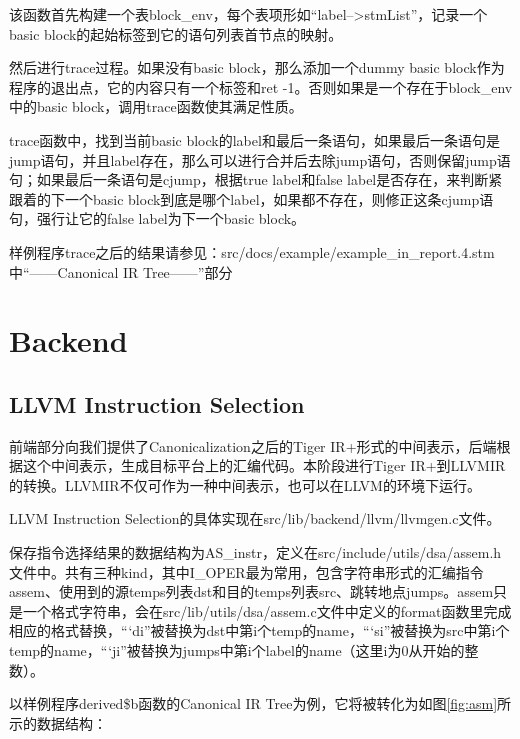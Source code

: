 \documentclass{article}
\begin{document}
该函数首先构建一个表block\_env，每个表项形如“label-->stmList”，记录一个basic block的起始标签到它的语句列表首节点的映射。

然后进行trace过程。如果没有basic block，那么添加一个dummy basic block作为程序的退出点，它的内容只有一个标签和ret -1。否则如果是一个存在于block\_env中的basic block，调用trace函数使其满足性质。

trace函数中，找到当前basic block的label和最后一条语句，如果最后一条语句是jump语句，并且label存在，那么可以进行合并后去除jump语句，否则保留jump语句；如果最后一条语句是cjump，根据true label和false label是否存在，来判断紧跟着的下一个basic block到底是哪个label，如果都不存在，则修正这条cjump语句，强行让它的false label为下一个basic block。

样例程序trace之后的结果请参见：src/docs/example/example\_in\_report.4.stm中“------Canonical IR Tree------”部分

\section{Backend}
\subsection{LLVM Instruction Selection}
前端部分向我们提供了Canonicalization之后的Tiger IR+形式的中间表示，后端根据这个中间表示，生成目标平台上的汇编代码。本阶段进行Tiger IR+到LLVMIR的转换。LLVMIR不仅可作为一种中间表示，也可以在LLVM的环境下运行。

LLVM Instruction Selection的具体实现在src/lib/backend/llvm/llvmgen.c文件。

保存指令选择结果的数据结构为AS\_instr，定义在src/include/utils/dsa/assem.h文件中。共有三种kind，其中I\_OPER最为常用，包含字符串形式的汇编指令assem、使用到的源temps列表dst和目的temps列表src、跳转地点jumps。assem只是一个格式字符串，会在src/lib/utils/dsa/assem.c文件中定义的format函数里完成相应的格式替换，“`di”被替换为dst中第i个temp的name，“`si”被替换为src中第i个temp的name，“`ji”被替换为jumps中第i个label的name（这里i为0从开始的整数）。

以样例程序derived\$b函数的Canonical IR Tree为例，它将被转化为如图\ref{fig:asm}所示的数据结构：
\end{document}

